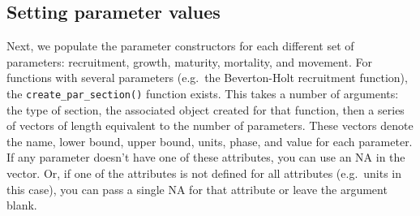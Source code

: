 \documentclass[
]{article}
\begin{document}
\hypertarget{setting-parameter-values}{%
\subsection{Setting parameter values}\label{setting-parameter-values}}

Next, we populate the parameter constructors for each different set of
parameters: recruitment, growth, maturity, mortality, and movement. For
functions with several parameters (e.g.~the Beverton-Holt recruitment
function), the \texttt{create\_par\_section()} function exists. This
takes a number of arguments: the type of section, the associated object
created for that function, then a series of vectors of length equivalent
to the number of parameters. These vectors denote the name, lower bound,
upper bound, units, phase, and value for each parameter. If any
parameter doesn't have one of these attributes, you can use an NA in the
vector. Or, if one of the attributes is not defined for all attributes
(e.g.~units in this case), you can pass a single NA for that attribute
or leave the argument blank.
\end{document}
